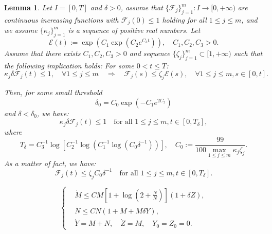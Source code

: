 \documentclass[10pt,a4paper]{amsart}
\newtheorem{lem}{Lemma}
\begin{document}
\begin{lem}\label{Bootstrap Closure Lemma}
 Let $I=[0,T]$ and $\delta>0$, assume that $\{\mathcal F_j\}_{j=1}^m: I\to [0,+\infty)$ are continuous increasing functions with $\mathcal F_j(0)\le 1$ holding for all $1\le j\le m$, and we assume $\{\kappa_j\}_{j=1}^m$ is a sequence of positive real numbers. Let
 \begin{equation*}
  \mathcal E(t):=\exp(C_1\exp(C_2 e^{C_3t})),\quad C_1,C_2,C_3>0.   
 \end{equation*}
 Assume that there exists $C_1,C_2,C_3>0$ and sequence $\{\zeta_j\}_{j=1}^m \subset [1,+\infty)$ such that the following implication holds: For some $0<t\le T$:
 \begin{equation}\label{Bootstrap Implication}
\kappa_j\delta \mathcal F_j(t)\le 1,\quad\forall 1\le j\le m \quad\Longrightarrow\quad   \mathcal F_j(s)\le \zeta_j\mathcal E(s), \quad\forall 1\le j\le m, s\in [0,t].
 \end{equation}

 Then, for some small threshold 
 \begin{equation}\label{Delta0 Definition}
  \delta_0=C_0\exp(-C_1 e^{2C_2})  
 \end{equation}
 and $\delta<\delta_0$, we have: 
 \begin{equation*}
  \kappa_j\delta \mathcal F_j(t)\le 1  \quad\text{for all }1\le j\le m , t\in[0,T_\delta], 
 \end{equation*}
 where
 \begin{equation}\label{Triple Log Lifespan}
  T_\delta=C_3^{-1}\log[C_2^{-1}\log(C_1^{-1}\log(C_0\delta^{-1}))],\quad C_0:=\frac{99}{100\max_{1\le j\le m}  \kappa_j \zeta_j}.
 \end{equation}
 As a matter of fact, we have:
 \begin{equation}\label{Finiteness on Bootstrap interval}
   \mathcal F_j(t)  \le \zeta_j C_0\delta^{-1}\quad\text{for all }1\le j\le m, t\in[0,T_\delta].
 \end{equation}
\end{lem}

    \begin{equation}\label{Boussinesq Differential Inequalities}
\left\{
\begin{aligned}
&\dot M\le CM[1+\log(2+\frac{\dot N}{N})] (1+\delta Z),\\
&\dot N\le CN (1+M+M\delta Y),\\
&  \dot Y=M+N,\quad \dot Z=M,\quad Y_0=Z_0=0.
\end{aligned}
\right.
\end{equation}
\end{document}
